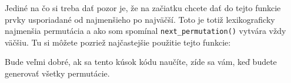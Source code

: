 Jediné na čo si treba dať pozor je, že na začiatku chcete dať do tejto funkcie prvky usporiadané od
najmenšieho po najväčší. Toto je totiž lexikograficky najmenšia permutácia a ako som spomínal
\texttt{next_permutation()} vytvára vždy väčšiu. Tu si môžete pozriež najčastejšie použitie tejto
funkcie:


Bude veľmi dobré, ak sa tento kúsok kódu naučíte, zíde sa vám, keď budete generovať všetky
permutácie.


